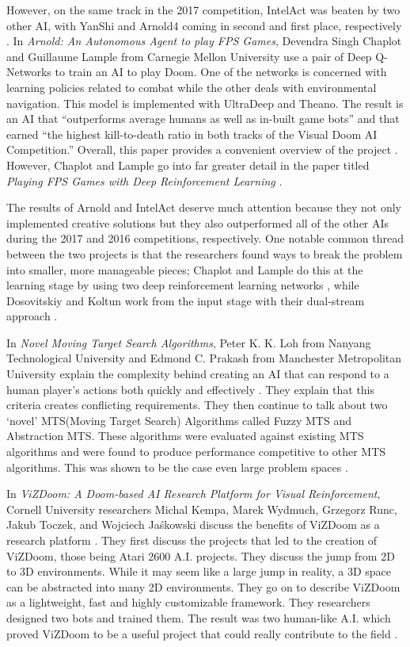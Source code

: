 However, on the same track in the 2017 competition, IntelAct was beaten by two other AI, with YanShi and Arnold4 coming in second and first place, respectively \cite{VDComp:2017}. In {\it Arnold: An Autonomous Agent to play FPS Games}, Devendra Singh Chaplot and Guillaume Lample from Carnegie Mellon University use a pair of Deep Q-Networks to train an AI to play Doom. One of the networks is concerned with learning policies related to combat while the other deals with environmental navigation. This model is implemented with UltraDeep and Theano. The result is an AI that ``outperforms average humans as well as in-built game bots'' and that earned ``the highest kill-to-death ratio in both tracks of the Visual Doom AI Competition.'' Overall, this paper provides a convenient overview of the project \cite{Chaplot}. However, Chaplot and Lample go into far greater detail in the paper titled {\it Playing FPS Games with Deep Reinforcement Learning} \cite{Chaplot:2016}.

The results of Arnold and IntelAct deserve much attention because they not only implemented creative solutions but they also outperformed all of the other AIs during the 2017 and 2016 competitions, respectively. One notable common thread between the two projects is that the researchers found ways to break the problem into smaller, more manageable pieces; Chaplot and Lample do this at the learning stage by using two deep reinforcement learning networks \cite{Chaplot}, while Dosovitskiy and Koltun work from the input stage with their dual-stream approach \cite{Dosovitskiy:2016}.

In {\it Novel Moving Target Search Algorithms}, Peter K. K. Loh from Nanyang Technological University and Edmond C. Prakash from Manchester Metropolitan University explain the complexity behind creating an AI that can respond to a human player's actions both quickly and effectively \cite{Loh:2009}. They explain that this criteria creates conflicting requirements. They then continue to talk about two `novel' MTS(Moving Target Search) Algorithms called Fuzzy MTS and Abstraction MTS. These algorithms were evaluated against existing MTS algorithms and were found to produce performance competitive to other MTS algorithms. This was shown to be the case even large problem spaces \cite{Loh:2009}.

In {\it ViZDoom: A Doom-based AI Research Platform for Visual Reinforcement}, Cornell University researchers Michal Kempa, Marek Wydmuch, Grzegorz Runc, Jakub Toczek, and Wojciech Jaśkowski discuss the benefits of ViZDoom as a research platform \cite{Kempka:2016}. They first discuss the projects that led to the creation of ViZDoom, those being Atari 2600 A.I. projects. They discuss the jump from 2D to 3D environments. While it may seem like a large jump in reality, a 3D space can be abstracted into many 2D environments. They go on to describe ViZDoom as a lightweight, fast and highly customizable framework. They researchers designed two bots and trained them. The result was two human-like A.I. which proved ViZDoom to be a useful project that could really contribute to the field \cite{Kempka:2016}.


